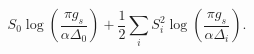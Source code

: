 \begin{equation}
S_{0}\log \left( \frac{\pi g_{s}}{\alpha \Delta _{0}}\right) +\frac{1}{2}%
\sum_{i}S_{i}^{2}\log \left( \frac{\pi g_{s}}{\alpha \Delta _{i}}\right) .
\end{equation}

